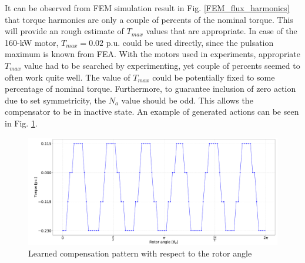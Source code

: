 It can be observed from FEM simulation result in Fig. \ref{FEM_flux_harmonics} that torque harmonics are only a couple of percents of the nominal torque. This will provide an rough estimate of $T_{max}$ values that are appropriate. In case of the 160-kW motor, $T_{max} = 0.02$ p.u. could be used directly, since the pulsation maximum is known from FEA. With the motors used in experiments, appropriate $T_{max}$ value had to be searched by experimenting, yet couple of percents seemed to often work quite well. The value of $T_{max}$ could be potentially fixed to some percentage of nominal torque. Furthermore, to guarantee inclusion of zero action due to set symmetricity, the $N_a$ value should be odd. This allows the compensator to be in inactive state. An example of generated actions can be seen in Fig. \ref{fig:learned_pattern_torque}.
\begin{figure}[htb] 
    \centering
    \includegraphics[width=\textwidth]{images/learned-compensation-pattern.pdf}
    \caption{\small Learned compensation pattern with respect to the rotor angle}
    \label{fig:learned_pattern_torque}
\end{figure}







